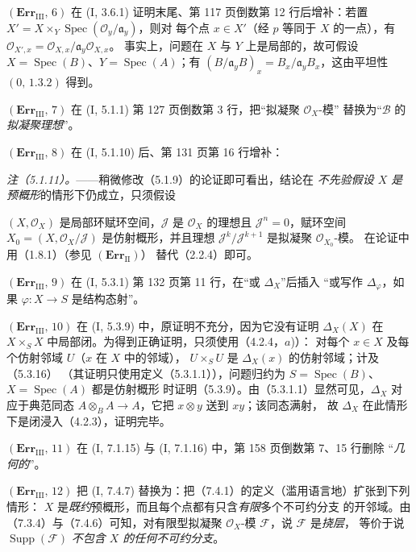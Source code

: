 \documentclass[UTF8,fontset=none,11pt,oneside,openany]{ctexbook}
\newcommand{\oldpage}[2][]{%
  \hypertarget{ega-source-page-#1-#2}{}%
  \marginnote{\scriptsize\textbf{#1}~|~#2}\ignorespaces}
\begin{document}
\noindent\textbf{$(\mathbf{Err}_{\mathrm{III}},\,6)$} 在
(I, 3.6.1) 证明末尾、第 117 页倒数第 12 行后增补：若置
$X'=X\times_Y\operatorname{Spec}(\mathscr O_y/\mathfrak a_y)$，则对
每个点 $x\in X'$（经 $p$ 等同于 $X$ 的一点），有
$\mathscr O_{X',x}=\mathscr O_{X,x}/\mathfrak a_y\mathscr O_{X,x}$。
事实上，问题在 $X$ 与 $Y$ 上是局部的，故可假设
$X=\operatorname{Spec}(B)$、$Y=\operatorname{Spec}(A)$；有
$(B/\mathfrak a_yB)_x=B_x/\mathfrak a_yB_x$，这由平坦性
$(0,\,1.3.2)$ 得到。

\noindent\textbf{$(\mathbf{Err}_{\mathrm{III}},\,7)$} 在
(I, 5.1.1) 第 127 页倒数第 3 行，把“拟凝聚 $\mathscr O_X$-模”
替换为“$\mathscr B$ 的\emph{拟凝聚理想}”。

\noindent\textbf{$(\mathbf{Err}_{\mathrm{III}},\,8)$} 在
(I, 5.1.10) 后、第 131 页第 16 行增补：

\emph{注（5.1.11）。}——稍微修改（5.1.9）的论证即可看出，结论在
\emph{不先验假设 $X$ 是预概形}的情形下仍成立，只须假设

\oldpage[III]{220}
$(X,\mathscr O_X)$ 是局部环赋环空间，$\mathscr J$ 是
$\mathscr O_X$ 的理想且 $\mathscr J^n=0$，赋环空间
$X_0=(X,\mathscr O_X/\mathscr J)$ 是仿射概形，并且理想
$\mathscr J^k/\mathscr J^{k+1}$ 是拟凝聚 $\mathscr O_{X_0}$-模。
在论证中用（1.8.1）（参见 $(\mathbf{Err}_{\mathrm{II}})$）
替代（2.2.4）即可。

\noindent\textbf{$(\mathbf{Err}_{\mathrm{III}},\,9)$} 在
(I, 5.3.1) 第 132 页第 11 行，在“或 $\Delta_X$”后插入
“或写作 $\Delta_\varphi$，如果 $\varphi:X\to S$ 是结构态射”。

\noindent\textbf{$(\mathbf{Err}_{\mathrm{III}},\,10)$} 在
(I, 5.3.9) 中，原证明不充分，因为它没有证明 $\Delta_X(X)$ 在
$X\times_SX$ 中局部闭。为得到正确证明，只须使用（4.2.4，$a$)）：
对每个 $x\in X$ 及每个仿射邻域 $U$（$x$ 在 $X$ 中的邻域），
$U\times_SU$ 是 $\Delta_X(x)$ 的仿射邻域；计及（5.3.16）
（其证明只使用定义（5.3.1.1）），问题归约为
$S=\operatorname{Spec}(B)$、$X=\operatorname{Spec}(A)$ 都是仿射概形
时证明（5.3.9）。由（5.3.1.1）显然可见，$\Delta_X$ 对应于典范同态
$A\otimes_BA\to A$，它把 $x\otimes y$ 送到 $xy$；该同态满射，
故 $\Delta_X$ 在此情形下是闭浸入（4.2.3），证明完毕。

\noindent\textbf{$(\mathbf{Err}_{\mathrm{III}},\,11)$} 在
(I, 7.1.15) 与 (I, 7.1.16) 中，第 158 页倒数第 7、15 行删除
“\emph{几何的}”。

\noindent\textbf{$(\mathbf{Err}_{\mathrm{III}},\,12)$} 把
(I, 7.4.7) 替换为：把（7.4.1）的定义（滥用语言地）扩张到下列情形：
$X$ 是\emph{既约}预概形，而且每个点都有只含\emph{有限}多个不可约分支
的开邻域。由（7.3.4）与（7.4.6）可知，对有限型拟凝聚
$\mathscr O_X$-模 $\mathscr F$，说 $\mathscr F$ 是\emph{挠层}，
等价于说 $\operatorname{Supp}(\mathscr F)$
\emph{不包含 $X$ 的任何不可约分支}。
\end{document}
